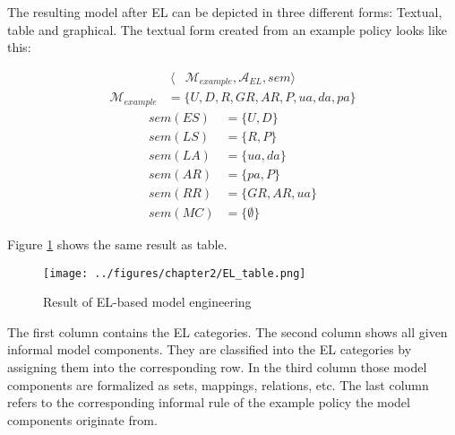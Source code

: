 \documentclass[twoside, openright, 12pt]{book}
\begin{document}


\noindent
The resulting model after EL can be depicted in three different forms: Textual, table and graphical.
The textual form created from an example policy looks like this:

\begin{align*}
\langle &\mathcal{M}_{\mathit{example}}, \mathcal{A}_{EL}, sem \rangle
\end{align*}
\begin{align*}
\mathcal{M}_{\mathit{example}} &= \lbrace U, D, R, \mathit{GR}, \mathit{AR}, P, \mathit{ua}, \mathit{da}, \mathit{pa} \rbrace
\end{align*}
\begin{align*}
sem(\mathit{ES}) &= \lbrace U, D \rbrace\\
sem(\mathit{LS}) &= \lbrace R, P \rbrace\\
sem(\mathit{LA}) &= \lbrace \mathit{ua}, \mathit{da} \rbrace\\
sem(\mathit{AR}) &= \lbrace \mathit{pa}, P \rbrace\\
sem(\mathit{RR}) &= \lbrace \mathit{GR}, \mathit{AR}, \mathit{ua} \rbrace\\
sem(\mathit{MC}) &= \lbrace \emptyset \rbrace
\end{align*}

\noindent
Figure \ref{fig:EL_table} shows the same result as table.

\begin{figure}[htb]
	\centering
	\texttt{[image: ../figures/chapter2/EL\_table.png]}
	\caption{Result of EL-based model engineering \cite[p.77, table 4.1]{Amthor18}}
	\label{fig:EL_table}
\end{figure}

\noindent
The first column contains the EL categories.
The second column shows all given informal model components.
They are classified into the EL categories by assigning them into the corresponding row.
In the third column those model components are formalized as sets, mappings, relations, etc.
The last column refers to the corresponding informal rule of the example policy the model components originate from.
\end{document}
